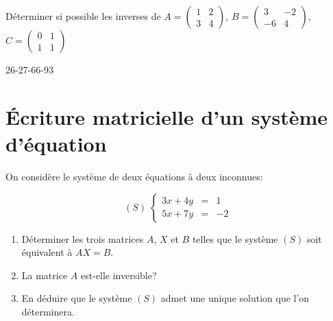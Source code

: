 \documentclass[a4paper]{article}
\begin{document}
\begin{exercice}{}{}
	 Déterminer si possible les inverses de $A=\begin{pmatrix}
1 & 2 \\
3 & 4
\end{pmatrix}$, 
$B=\begin{pmatrix}
3 & -2 \\
-6 & 4
\end{pmatrix}$, 
$C=\begin{pmatrix}
0 & 1 \\
1 & 1
\end{pmatrix}$

\end{exercice}
\begin{exercices}{}{}
	26-27-66-93
\end{exercices}
 
\section{Écriture matricielle d'un système d'équation}


\begin{example}{}{}
	On considère le système de deux équations à deux inconnues:

$$(S) \; \left \{
\begin{array}{rcl}
3x+4y &=& 1 \\
5x+7y & = & -2 
\end{array}
\right.$$

\begin{enumerate}
	\item Déterminer les trois matrices $A$, $X$ et $B$ telles que le système $(S)$ soit équivalent à $AX=B$.
	\item La matrice $A$ est-elle inversible?
	\item En déduire que le système $(S)$ admet une unique solution que l'on déterminera.
\end{enumerate}

\end{example}
\end{document}
